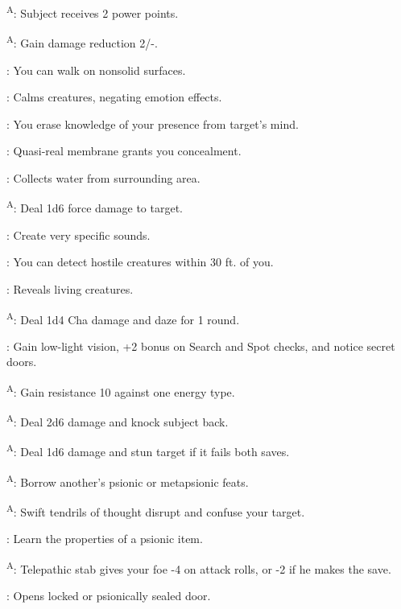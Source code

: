 \textsuperscript{A}: Subject receives 2 power points.

\textsuperscript{A}: Gain damage reduction 2/-.

: You can walk on nonsolid surfaces.

: Calms creatures, negating emotion effects.

: You erase knowledge of your presence from target's mind.

: Quasi-real membrane grants you concealment.

: Collects water from surrounding area.

\textsuperscript{A}: Deal 1d6 force damage to target.

: Create very specific sounds.

: You can detect hostile creatures within 30 ft. of you.

: Reveals living creatures.

\textsuperscript{A}: Deal 1d4 Cha damage and daze for 1 round.

: Gain low-light vision, +2 bonus on Search and Spot checks, and notice secret doors.

\textsuperscript{A}: Gain resistance 10 against one energy type.

\textsuperscript{A}: Deal 2d6 damage and knock subject back.

\textsuperscript{A}: Deal 1d6 damage and stun target if it fails both saves.

\textsuperscript{A}: Borrow another's psionic or metapsionic feats.

\textsuperscript{A}: Swift tendrils of thought disrupt and confuse your target.

: Learn the properties of a psionic item.

\textsuperscript{A}: Telepathic stab gives your foe -4 on attack rolls, or -2 if he makes the save.

: Opens locked or psionically sealed door.

